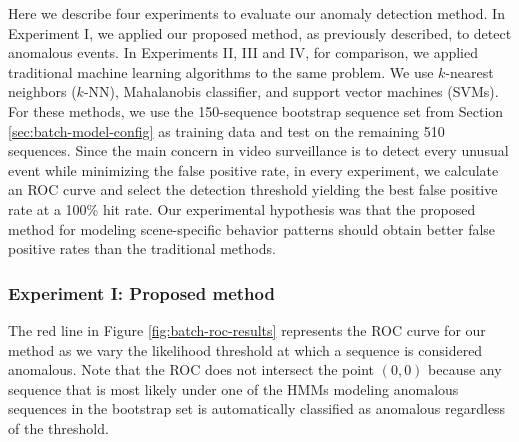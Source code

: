 Here we describe four experiments to evaluate our anomaly detection
method. In Experiment I, we applied our proposed method, as previously
described, to detect anomalous events. In Experiments II, III and IV,
for comparison, we applied traditional machine learning algorithms to
the same problem. We use $k$-nearest neighbors ($k$-NN), Mahalanobis 
classifier, and support vector machines (SVMs).  For
these methods, we use the 150-sequence bootstrap sequence set from
Section \ref{sec:batch-model-config} as training data and test on the
remaining 510 sequences.  Since the main concern in video surveillance
is to detect every unusual event while minimizing the false positive
rate, in every experiment, we calculate an ROC curve and select the
detection threshold yielding the best false positive rate at a 100\%
hit rate. Our experimental hypothesis was that the proposed method for
modeling scene-specific behavior patterns should obtain better false
positive rates than the traditional methods.

\subsubsection{Experiment I: Proposed method}

The red line in Figure \ref{fig:batch-roc-results} represents the ROC
curve for our method as we vary the likelihood threshold at which a
sequence is considered anomalous.  Note that the ROC does not
intersect the point $(0, 0)$ because any sequence that is most likely
under one of the HMMs modeling anomalous sequences in the bootstrap
set is automatically classified as anomalous regardless of the
threshold.

